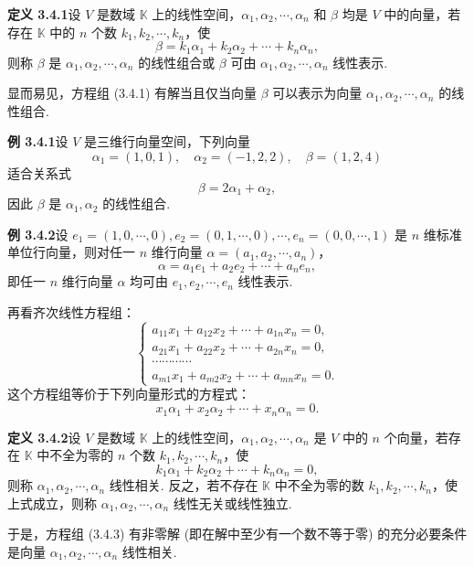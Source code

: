 \documentclass[UTF8,12pt,a4paper,fontset=fandol]{ctexart}
\begin{document}
\noindent\textbf{定义 3.4.1}\quad 设 $V$ 是数域 $\mathbb{K}$ 上的线性空间，$\alpha_1,\alpha_2,\cdots,\alpha_n$ 和 $\beta$ 均是 $V$ 中的向量，若存在 $\mathbb{K}$ 中的 $n$ 个数 $k_1,k_2,\cdots,k_n$，使
\[
\beta=k_1\alpha_1+k_2\alpha_2+\cdots+k_n\alpha_n,
\]
则称 $\beta$ 是 $\alpha_1,\alpha_2,\cdots,\alpha_n$ 的线性组合或 $\beta$ 可由 $\alpha_1,\alpha_2,\cdots,\alpha_n$ 线性表示.

显而易见，方程组 (3.4.1) 有解当且仅当向量 $\beta$ 可以表示为向量 $\alpha_1,\alpha_2,\cdots,\alpha_n$ 的线性组合.

\noindent\textbf{例 3.4.1}\quad 设 $V$ 是三维行向量空间，下列向量
\[
\alpha_1=(1,0,1),\quad \alpha_2=(-1,2,2),\quad \beta=(1,2,4)
\]
适合关系式
\[
\beta=2\alpha_1+\alpha_2,
\]
因此 $\beta$ 是 $\alpha_1,\alpha_2$ 的线性组合.

\noindent\textbf{例 3.4.2}\quad 设 $e_1=(1,0,\cdots,0),e_2=(0,1,\cdots,0),\cdots,e_n=(0,0,\cdots,1)$ 是 $n$ 维标准单位行向量，则对任一 $n$ 维行向量 $\alpha=(a_1,a_2,\cdots,a_n)$，
\[
\alpha=a_1e_1+a_2e_2+\cdots+a_ne_n,
\]
即任一 $n$ 维行向量 $\alpha$ 均可由 $e_1,e_2,\cdots,e_n$ 线性表示.

再看齐次线性方程组：
\begin{equation}
\left\{
\begin{array}{l}
a_{11}x_1+a_{12}x_2+\cdots+a_{1n}x_n=0,\\
a_{21}x_1+a_{22}x_2+\cdots+a_{2n}x_n=0,\\
\cdots\cdots\cdots\cdots\\
a_{m1}x_1+a_{m2}x_2+\cdots+a_{mn}x_n=0.
\end{array}
\right.
\tag{3.4.3}
\end{equation}
这个方程组等价于下列向量形式的方程式：
\begin{equation}
x_1\alpha_1+x_2\alpha_2+\cdots+x_n\alpha_n=0.
\tag{3.4.4}
\end{equation}

\noindent\textbf{定义 3.4.2}\quad 设 $V$ 是数域 $\mathbb{K}$ 上的线性空间，$\alpha_1,\alpha_2,\cdots,\alpha_n$ 是 $V$ 中的 $n$ 个向量，若存在 $\mathbb{K}$ 中不全为零的 $n$ 个数 $k_1,k_2,\cdots,k_n$，使
\[
k_1\alpha_1+k_2\alpha_2+\cdots+k_n\alpha_n=0,
\]
则称 $\alpha_1,\alpha_2,\cdots,\alpha_n$ 线性相关. 反之，若不存在 $\mathbb{K}$ 中不全为零的数 $k_1,k_2,\cdots,k_n$，使上式成立，则称 $\alpha_1,\alpha_2,\cdots,\alpha_n$ 线性无关或线性独立.

于是，方程组 (3.4.3) 有非零解 (即在解中至少有一个数不等于零) 的充分必要条件是向量 $\alpha_1,\alpha_2,\cdots,\alpha_n$ 线性相关.
\end{document}
